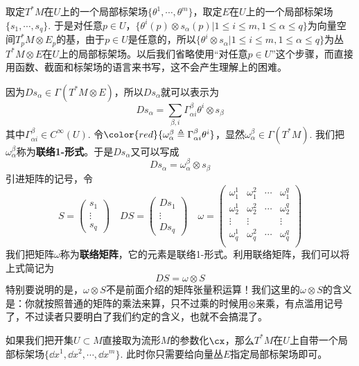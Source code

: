 取定$T^{\ast}M$在$U$上的一个局部标架场$\{\theta^{1},\cdots,\theta^{m} \}$，取定$E$在$U$上的一个局部标架场$\{s_{1},\cdots,s_{q} \}$. 于是对任意$p\in U$，$\{\theta^{i}(p)\otimes s_{\alpha} (p)| 1\leqslant i\leqslant m,1\leqslant \alpha\leqslant q\}$为向量空间$T^{\ast}_{p}M\otimes E_{p}$的基，由于$p\in U$是任意的，所以$\{\theta^{i}\otimes s_{\alpha} | 1\leqslant i\leqslant m,1\leqslant \alpha\leqslant q\}$为丛$T^{\ast}M\otimes E$在$U$上的局部标架场。以后我们省略使用“对任意$p\in U$”这个步骤，而直接用函数、截面和标架场的语言来书写，这不会产生理解上的困难。

因为$Ds_{\alpha}\in \Gamma(T^{\ast}M\otimes E)$，所以$Ds_{\alpha}$就可以表示为
\[
Ds_{\alpha}=\sum_{\beta,i}\Gamma^{\beta}_{\alpha i}  \theta^{i}\otimes s_{\beta}
\]
其中$\Gamma^{\beta}_{\alpha i}\in C^{\infty}(U)$. 令${\color{red}{\omega^{\beta}_{\alpha}\triangleq \Gamma^{\beta}_{\alpha i}  \theta^{i}}}$，显然$\omega^{\beta}_{\alpha}\in \Gamma(T^{\ast}M)$. 我们把$\omega^{\beta}_{\alpha}$称为\textbf{联络1-形式}。于是$Ds_{\alpha}$又可以写成
\begin{equation}
	Ds_{\alpha}=\omega^{\beta}_{\alpha}\otimes s_{\beta}
\end{equation}
引进矩阵的记号，令
\[
S=\left( \begin{array}{ccc}{s_{1}} \\ {\vdots}  \\ {s_{q}} \end{array}\right)\quad DS=\left( \begin{array}{ccc}{Ds_{1}} \\ {\vdots}  \\ {Ds_{q}} \end{array}\right) \quad  \omega=\left( \begin{array}{cccc}{\omega^{1}_{1}} & {\omega^{2}_{1}}&{\cdots}&{\omega^{q}_{1}}\\ {\omega^{1}_{2}} & {\omega^{2}_{2}}&{\cdots}&{\omega^{q}_{2}}\\ {\vdots} & {\vdots}&{ }&{\vdots}\\{\omega^{1}_{q}} & {\omega^{2}_{q}}&{\cdots}&{\omega^{q}_{q}}\\ \end{array}\right)
\]
我们把矩阵$\omega$称为\textbf{联络矩阵}，它的元素是联络1-形式。利用联络矩阵，我们可以将上式简记为
\[
DS=\omega\otimes S
\]
特别要说明的是，$\omega\otimes S$不是前面介绍的矩阵张量积运算！我们这里的$\omega\otimes S$的含义是：你就按照普通的矩阵的乘法来算，只不过乘的时候用$\otimes$来乘，有点滥用记号了，不过读者只要明白了我们约定的含义，也就不会搞混了。
\begin{remark}
	如果我们把开集$U\subset M$直接取为流形$M$的参数化$\cx$，那么$T^{\ast}M$在$U$上自带一个局部标架场$\{\dd x^{1},\dd x^{2},\cdots,\dd x^{m} \}$. 此时你只需要给向量丛$E$指定局部标架场即可。
\end{remark}

